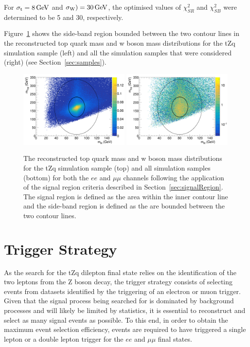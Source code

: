 For $\sigma_{\mathrm{t}} = 8\,\text{Ge\hspace{-.08em}V}$ and $\sigma_{\mathrm{W}}) = 30\,\text{Ge\hspace{-.08em}V}$, the optimised values of $\chi^{2}_{SR}$ and $\chi^{2}_{SB}$ were determined to be 5 and 30, respectively.

Figure~\ref{fig:blindingChi2} shows the side-band region bounded between the two contour lines in  the reconstructed top quark mass and w boson mass distributions for the tZq simulation sample (left) and all the simulation samples that were considered (right) (see Section~\ref{sec:samples}).

\begin{figure}[!h]
\centering
\includegraphics[width=0.49\textwidth]{figs/blinding/tZq_topVsWmass.png}
\includegraphics[width=0.49\textwidth]{figs/blinding/all_topVsWmass.png}
\caption{
The reconstructed top quark mass and w boson mass distributions for the tZq simulation sample (top) and all simulation samples (bottom) for both the $ee$ and $\mu\mu$ channels following the application of the signal region criteria described in Section~\ref{sec:signalRegion}.
The signal region is defined as the area within the inner contour line and the side-band region is defined as the are bounded between the two contour lines.
}
\label{fig:blindingChi2}
\end{figure}

\section{Trigger Strategy}\label{sec:triggerStrategy}
As the search for the tZq dilepton final state relies on the identification of the two leptons from the Z boson decay, the trigger strategy consists of selecting events from datasets identified by the triggering of an electron or muon trigger.
Given that the signal process being searched for is dominated by background processes and will likely be limited by statistics, it is essential to reconstruct and select as many signal events as possible.
To this end, in order to obtain the maximum event selection efficiency, events are required to have triggered a single lepton or a double lepton trigger for the $ee$ and $\mu\mu$ final states.


